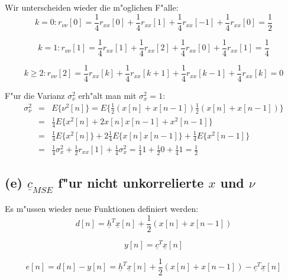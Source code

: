 Wir unterscheiden wieder die m"oglichen F"alle:
\begin{equation}
 k=0: r_{\nu \nu}[0] = \frac{1}{4} r_{xx}[0] + \frac{1}{4} r_{xx}[1] + \frac{1}{4} r_{xx}[-1] + \frac{1}{4} r_{xx}[0] = \frac{1}{2}
\end{equation}

\begin{equation}
 k=1: r_{\nu \nu}[1] = \frac{1}{4} r_{xx}[1] + \frac{1}{4} r_{xx}[2] + \frac{1}{4} r_{xx}[0] + \frac{1}{4} r_{xx}[1] = \frac{1}{4}
\end{equation}

\begin{equation}
 k \geq 2: r_{\nu \nu}[2] = \frac{1}{4} r_{xx}[k] + \frac{1}{4} r_{xx}[k+1] + \frac{1}{4} r_{xx}[k-1] + \frac{1}{4} r_{xx}[k] = 0
\end{equation}

F"ur die Varianz $\sigma_\nu^2$ erh"alt man mit $\sigma_x^2 = 1$:
\begin{eqnarray}
 \sigma_\nu^2 & = & E\{\nu^2[n]\} = E\{\frac{1}{2} (x[n] + x[n-1]) \frac{1}{2} (x[n] + x[n-1])\} \\
 & = & \frac{1}{4} E\{x^2[n] + 2 x[n]x[n-1] + x^2[n-1]\} \\
 & = & \frac{1}{4} E\{x^2[n]\} + 2 \frac{1}{4} E\{x[n]x[n-1]\} + \frac{1}{4} E\{x^2[n-1]\} \\
 & = & \frac{1}{4} \sigma_x^2 + \frac{1}{2} r_{xx}[1] + \frac{1}{4} \sigma_x^2 = \frac{1}{4} 1 + \frac{1}{2} 0 + \frac{1}{4} 1 = \frac{1}{2}
\end{eqnarray}


\subsection{(e) $\underline{c}_{MSE}$ f"ur nicht unkorrelierte $x$ und $\nu$}

Es m"ussen wieder neue Funktionen definiert werden:
\begin{equation}
  d[n] = \underline{h}^T \underline{x}[n] + \frac{1}{2} (x[n] + x[n-1])
\end{equation}

\begin{equation}
  y[n] = \underline{c}^T \underline{x}[n]
\end{equation}

\begin{equation}
 e[n] = d[n] - y[n] = \underline{h}^T \underline{x}[n] + \frac{1}{2} (x[n] + x[n-1]) - \underline{c}^T \underline{x}[n]
\end{equation}


